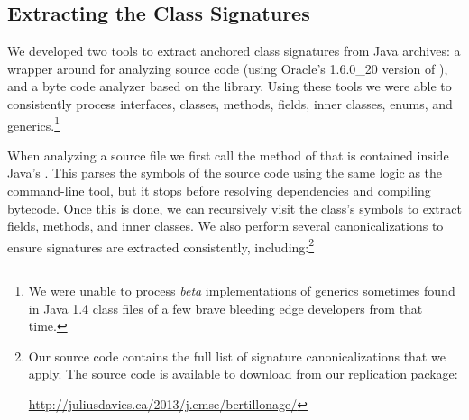 \subsection{Extracting the Class Signatures}
\label{subsec:extractSignature}

We developed two tools to extract anchored class signatures from Java
archives: a wrapper around  for analyzing source code (using Oracle's 1.6.0\_20 version of ),
and a byte code analyzer based on the  library.  Using these
tools we were able to consistently process interfaces, classes, methods,
fields, inner classes, enums, and generics.\footnote{We were unable to
process \emph{beta} implementations of generics sometimes found in Java 1.4
class files of a few brave bleeding edge developers from that time.}

When analyzing a source file we first call the  method of
 that is contained inside
Java's .  This parses the symbols of the source code
using the same logic as the command-line  tool, but it stops
before resolving dependencies and compiling bytecode.  Once this is done,
we can recursively visit the class's symbols to extract fields, methods,
and inner classes.  We also perform several canonicalizations to ensure
signatures are extracted consistently, including:\footnote{Our source code
contains the full list of signature canonicalizations that we apply.
The source code is available to download from our replication package:

\url{http://juliusdavies.ca/2013/j.emse/bertillonage/}}


